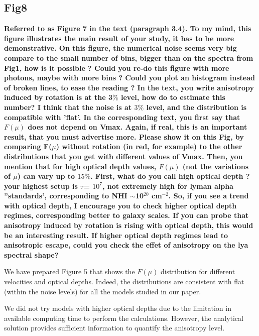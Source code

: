 \documentclass[12pt]{article}
\begin{document}
\subsection*{Fig8}


{\bf Referred to as Figure 7 in the text (paragraph 3.4). To my mind,
  this figure illustrates the main result of your study, it has to be
  more demonstrative. On this figure, the numerical noise seems very
  big compare to the small number of bins, bigger than on the spectra
  from Fig1, how is it possible ? Could you re-do this figure with
  more photons, maybe with more bins ? Could you plot an histogram
  instead of broken lines, to ease the reading ? In the text, you
  write anisotropy induced by rotation is at the 3$\%$ level, how do
  to estimate this number? I think that the noise is at $3\%$ level,
  and the distribution is compatible with ’flat’. In the corresponding
  text, you first say that $F(\mu)$ does not depend on Vmax. Again, if
  real, this is an important result, that you must advertise
  more. Please show it on this Fig, by comparing F($\mu$) without rotation
  (in red, for example) to the other distributions that you get with
  different values of Vmax. Then, you mention that for high optical
  depth values, $F(\mu)$ (not the variations of $\mu$) can vary up to
  $15\%$. First, what do you call high optical depth ? your highest
  setup is $\tau$= $10^7$, not extremely high for lyman alpha ”standards’,
  corresponding to NHI $\sim$10$^{20}$ cm$^{-2}$. So, if you see a trend with
  optical depth, I encourage you to check higher optical depth
  regimes, corresponding better to galaxy scales. If you can probe
  that anisotropy induced by rotation is rising with optical depth,
  this would be an interesting result. If higher optical depth regimes
  lead to anisotropic escape, could you check the effet of anisotropy
  on the lya spectral shape?} 


We have prepared Figure 5 that shows the $F(\mu)$ distribution for
different velocities and optical depths. Indeed, the distributions are
consistent with flat (within the noise levels) for all the models
studied in our paper. 

We did not try models with higher optical depths due to the
limitation in available computing time to perform the
calculations. However, the analytical solution provides sufficient
information to quantify the anisotropy level.
\end{document}
